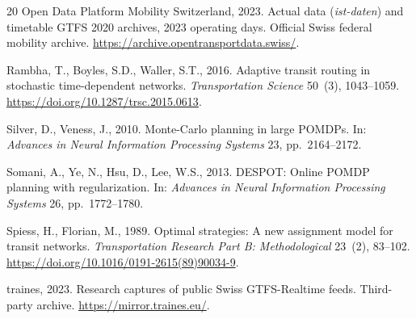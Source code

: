 \documentclass[preprint,12pt,authoryear]{elsarticle}
\begin{document}
\begin{thebibliography}{20}
Open Data Platform Mobility Switzerland, 2023. Actual data (\emph{ist-daten})
and timetable GTFS 2020 archives, 2023 operating days. Official Swiss federal
mobility archive. \url{https://archive.opentransportdata.swiss/}.

Rambha, T., Boyles, S.D., Waller, S.T., 2016. Adaptive transit routing in
stochastic time-dependent networks. \emph{Transportation Science} 50~(3),
1043--1059. \url{https://doi.org/10.1287/trsc.2015.0613}.

Silver, D., Veness, J., 2010. Monte-Carlo planning in large POMDPs. In:
\emph{Advances in Neural Information Processing Systems} 23, pp.~2164--2172.

Somani, A., Ye, N., Hsu, D., Lee, W.S., 2013. DESPOT: Online POMDP planning with
regularization. In: \emph{Advances in Neural Information Processing Systems}
26, pp.~1772--1780.

Spiess, H., Florian, M., 1989. Optimal strategies: A new assignment model for
transit networks. \emph{Transportation Research Part B: Methodological}
23~(2), 83--102. \url{https://doi.org/10.1016/0191-2615(89)90034-9}.

traines, 2023. Research captures of public Swiss GTFS-Realtime feeds.
Third-party archive. \url{https://mirror.traines.eu/}.

\end{thebibliography}
\end{document}
